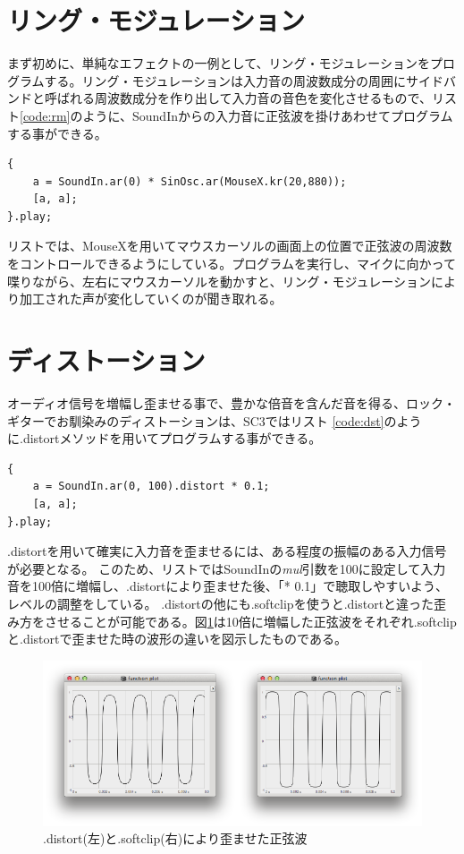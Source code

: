 \documentclass{jsarticle}
\begin{document}
\section{リング・モジュレーション}
まず初めに、単純なエフェクトの一例として、リング・モジュレーションをプログラムする。リング・モジュレーションは入力音の周波数成分の周囲にサイドバンドと呼ばれる周波数成分を作り出して入力音の音色を変化させるもので、リスト\ref{code:rm}のように、SoundInからの入力音に正弦波を掛けあわせてプログラムする事ができる。

\begin{lstlisting}[caption=リング・モジュレーション,label=code:rm]
{
	a = SoundIn.ar(0) * SinOsc.ar(MouseX.kr(20,880));
	[a, a];
}.play;
\end{lstlisting}

リストでは、MouseXを用いてマウスカーソルの画面上の位置で正弦波の周波数をコントロールできるようにしている。プログラムを実行し、マイクに向かって喋りながら、左右にマウスカーソルを動かすと、リング・モジュレーションにより加工された声が変化していくのが聞き取れる。

\section{ディストーション}
オーディオ信号を増幅し歪ませる事で、豊かな倍音を含んだ音を得る、ロック・ギターでお馴染みのディストーションは、SC3ではリスト
\ref{code:dst}のように.distortメソッドを用いてプログラムする事ができる。

\begin{lstlisting}[caption=ディストーション, label=code:dst]
{
	a = SoundIn.ar(0, 100).distort * 0.1;
	[a, a];
}.play;
\end{lstlisting}

.distortを用いて確実に入力音を歪ませるには、ある程度の振幅のある入力信号が必要となる。
このため、リストではSoundInの{\it mul}引数を100に設定して入力音を100倍に増幅し、.distortにより歪ませた後、「* 0.1」で聴取しやすいよう、レベルの調整をしている。
.distortの他にも.softclipを使うと.distortと違った歪み方をさせることが可能である。図\ref{fig:comparison}は10倍に増幅した正弦波をそれぞれ.softclipと.distortで歪ませた時の波形の違いを図示したものである。

\begin{figure}[htbp]
	\begin{center}
		\includegraphics[scale=0.6]{comparison.pdf}
	\end{center}
	\caption{.distort(左)と.softclip(右)により歪ませた正弦波}
	\label{fig:comparison}
\end{figure}
\end{document}
